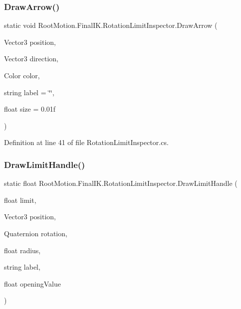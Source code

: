 \subsubsection{\texorpdfstring{Draw\+Arrow()}{DrawArrow()}}
{\footnotesize\ttfamily static void Root\+Motion.\+Final\+I\+K.\+Rotation\+Limit\+Inspector.\+Draw\+Arrow (\begin{DoxyParamCaption}\item[{Vector3}]{position,  }\item[{Vector3}]{direction,  }\item[{Color}]{color,  }\item[{string}]{label = {\ttfamily \char`\"{}\char`\"{}},  }\item[{float}]{size = {\ttfamily 0.01f} }\end{DoxyParamCaption})\hspace{0.3cm}{\ttfamily [static]}}



Definition at line 41 of file Rotation\+Limit\+Inspector.\+cs.

\mbox{\label{class_root_motion_1_1_final_i_k_1_1_rotation_limit_inspector_a70c4e2682ace49d0d31a552a2f9835bc}} 
\subsubsection{\texorpdfstring{Draw\+Limit\+Handle()}{DrawLimitHandle()}}
{\footnotesize\ttfamily static float Root\+Motion.\+Final\+I\+K.\+Rotation\+Limit\+Inspector.\+Draw\+Limit\+Handle (\begin{DoxyParamCaption}\item[{float}]{limit,  }\item[{Vector3}]{position,  }\item[{Quaternion}]{rotation,  }\item[{float}]{radius,  }\item[{string}]{label,  }\item[{float}]{opening\+Value }\end{DoxyParamCaption})\hspace{0.3cm}{\ttfamily [static]}}



